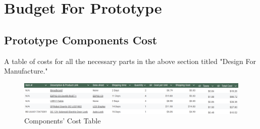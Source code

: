 \section{Budget For Prototype}

\subsection{Prototype Components Cost}

A table of costs for all the necessary parts in the above section titled "Design For Manufacture."

\begin{figure}[!ht]
    \centering
    \includegraphics[width=1.2\linewidth]{./img/Budget_Table.png}
    \caption{Components' Cost Table}
    \label{fig:enter-label}
\end{figure}